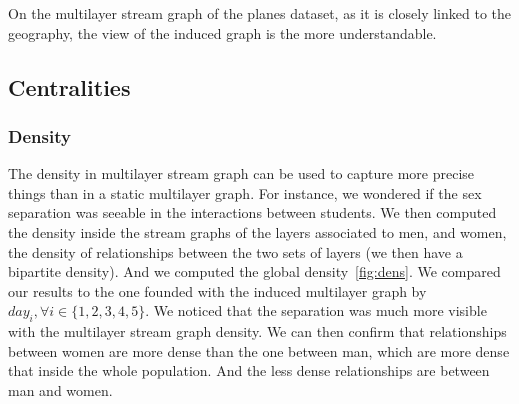 \documentclass{svproc}
\begin{document}
On the multilayer stream graph of the planes dataset, as it is closely linked to the geography, the view of the induced graph is the more understandable.

\subsection{Centralities}
\subsubsection{Density}

The density in multilayer stream graph can be used to capture more precise things than in a static multilayer graph. For instance, we wondered if the sex separation was seeable in the interactions between students. We then computed the density inside the stream graphs of the layers associated to men, and women, the density of relationships between the two sets of layers (we then have a bipartite density). And we computed the global density~\cref{fig:dens}. We compared our results to the one founded with the induced multilayer graph by $day_i, \forall i \in \{1,2,3,4,5\}$. We noticed that the separation was much more visible with the multilayer stream graph density. We can then confirm that relationships between women are more dense than the one between man, which are more dense that inside the whole population. And the less dense relationships are between man and women.
\end{document}
